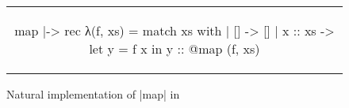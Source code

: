 \begin{figure}[tp]
\begin{tabular}{c}
\begin{Datalang}
map |-> rec λ(f, xs) = match xs with
                       | [] -> []
                       | x :: xs -> let y = f x in y :: @map (f, xs)
\end{Datalang}
\end{tabular}
\caption{Natural implementation of \datalang|map| in \DataLang}
\label{fig:map}
\end{figure}